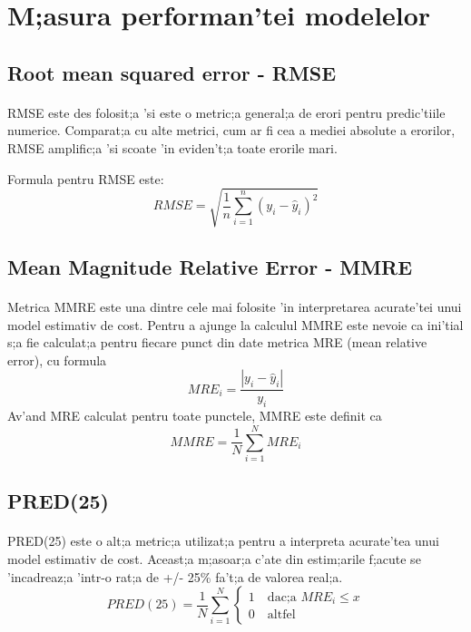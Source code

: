 \section {M;asura performan'tei modelelor}
\subsection{Root mean squared error - RMSE}

\paragraph{}
RMSE este des folosit;a 'si este o metric;a general;a de erori pentru predic'tiile numerice. Comparat;a cu alte metrici, cum ar fi cea a mediei absolute a erorilor, RMSE amplific;a 'si scoate 'in eviden't;a toate erorile mari.
\par
Formula pentru RMSE este:
\begin{equation}
RMSE = \sqrt{\frac {1} {n} \displaystyle \sum_{i=1}^{n}(y_i -\hat  y_i)^2}
\end{equation}

\subsection{Mean Magnitude Relative Error - MMRE}
\paragraph{}
Metrica MMRE este una dintre cele mai folosite 'in interpretarea acurate'tei unui model estimativ de cost. 
Pentru a ajunge la calculul MMRE este nevoie ca ini'tial s;a fie calculat;a pentru fiecare punct din date metrica MRE (mean relative error), cu formula
\begin{equation}
MRE_i = \frac {|y_i - \hat y_i|} {y_i}
\end{equation}
Av'and MRE calculat pentru toate punctele, MMRE este definit ca
\begin{equation}
MMRE = \frac {1} {N} \displaystyle \sum_{i=1}^{N}MRE_i
\end{equation}
\subsection{PRED(25)}
\paragraph{}
PRED(25) este o alt;a metric;a utilizat;a pentru a interpreta acurate'tea unui model estimativ de cost. Aceast;a m;asoar;a c'ate din estim;arile f;acute se 'incadreaz;a 'intr-o rat;a de +/- 25\% fa't;a de valorea real;a.
\begin{equation}
PRED(25) = \frac{1} {N} \displaystyle \sum_{i=1}^{N} \begin {cases} 1 \quad \text{dac;a $MRE_i \leq x$} \\
										       0 \quad \text {altfel}
							 	\end{cases}
\end{equation}